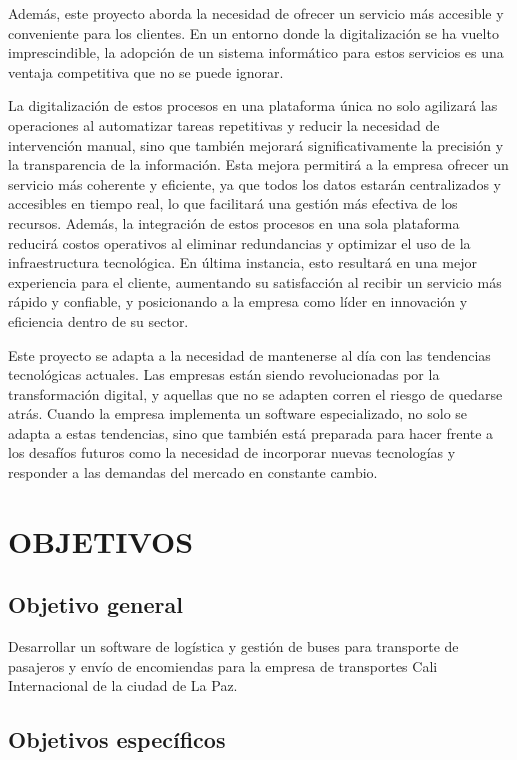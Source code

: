 	Además, este proyecto aborda la necesidad de ofrecer un servicio más accesible y conveniente para los clientes. En un entorno donde la digitalización se ha vuelto imprescindible, la adopción de un sistema informático para estos servicios es una ventaja competitiva que no se puede ignorar.
	
	La digitalización de estos procesos en una plataforma única no solo agilizará las operaciones al automatizar tareas repetitivas y reducir la necesidad de intervención manual, sino que también mejorará significativamente la precisión y la transparencia de la información. Esta mejora permitirá a la empresa ofrecer un servicio más coherente y eficiente, ya que todos los datos estarán centralizados y accesibles en tiempo real, lo que facilitará una gestión más efectiva de los recursos. Además, la integración de estos procesos en una sola plataforma reducirá costos operativos al eliminar redundancias y optimizar el uso de la infraestructura tecnológica. En última instancia, esto resultará en una mejor experiencia para el cliente, aumentando su satisfacción al recibir un servicio más rápido y confiable, y posicionando a la empresa como líder en innovación y eficiencia dentro de su sector.
	
	Este proyecto se adapta a la necesidad de mantenerse al día con las tendencias tecnológicas actuales. Las empresas están siendo revolucionadas por la transformación digital, y aquellas que no se adapten corren el riesgo de quedarse atrás. Cuando la empresa implementa un software especializado, no solo se adapta a estas tendencias, sino que también está preparada para hacer frente a los desafíos futuros como la necesidad de incorporar nuevas tecnologías y responder a las demandas del mercado en constante cambio.
	
\section{OBJETIVOS}
	\subsection{Objetivo general}
	
		Desarrollar un software de logística y gestión de buses para transporte de pasajeros y envío de encomiendas para la empresa de transportes Cali Internacional de la ciudad de La Paz.
		
	\subsection{Objetivos específicos}
	
